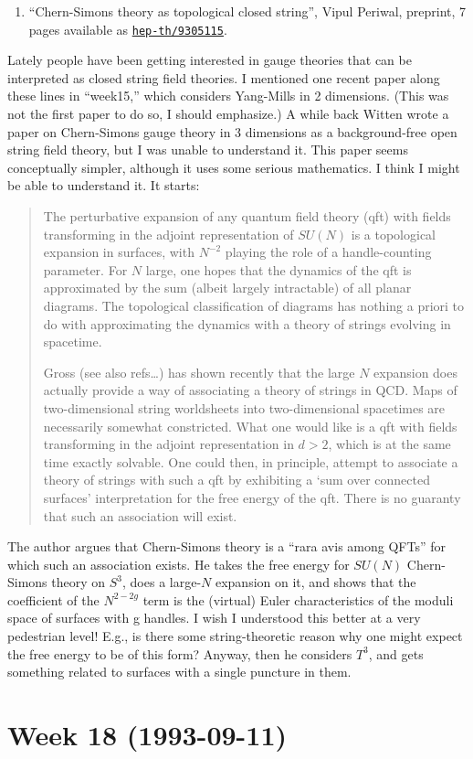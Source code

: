 \documentclass{article}
\def\tightlist{}
\begin{document}
\begin{enumerate}
\def\labelenumi{\arabic{enumi})}
\setcounter{enumi}{10}
\tightlist
\item
  ``Chern-Simons theory as topological closed string'', Vipul Periwal,
  preprint, 7 pages available as
  \href{http://xxx.lanl.gov/abs/hep-th/9305115}{\texttt{hep-th/9305115}}.
\end{enumerate}

Lately people have been getting interested in gauge theories that can be
interpreted as closed string field theories. I mentioned one recent
paper along these lines in ``week15,'' which considers Yang-Mills in 2
dimensions. (This was not the first paper to do so, I should emphasize.)
A while back Witten wrote a paper on Chern-Simons gauge theory in 3
dimensions as a background-free open string field theory, but I was
unable to understand it. This paper seems conceptually simpler, although
it uses some serious mathematics. I think I might be able to understand
it. It starts:

\begin{quote}
The perturbative expansion of any quantum field theory (qft) with fields
transforming in the adjoint representation of \(SU(N)\) is a topological
expansion in surfaces, with \(N^{-2}\) playing the role of a
handle-counting parameter. For \(N\) large, one hopes that the dynamics
of the qft is approximated by the sum (albeit largely intractable) of
all planar diagrams. The topological classification of diagrams has
nothing a priori to do with approximating the dynamics with a theory of
strings evolving in spacetime.

Gross (see also refs\ldots) has shown recently that the large \(N\)
expansion does actually provide a way of associating a theory of strings
in QCD. Maps of two-dimensional string worldsheets into two-dimensional
spacetimes are necessarily somewhat constricted. What one would like is
a qft with fields transforming in the adjoint representation in
\(d > 2\), which is at the same time exactly solvable. One could then,
in principle, attempt to associate a theory of strings with such a qft
by exhibiting a `sum over connected surfaces' interpretation for the
free energy of the qft. There is no guaranty that such an association
will exist.
\end{quote}

The author argues that Chern-Simons theory is a ``rara avis among QFTs''
for which such an association exists. He takes the free energy for
\(SU(N)\) Chern-Simons theory on \(S^3\), does a large-\(N\) expansion
on it, and shows that the coefficient of the \(N^{2-2g}\) term is the
(virtual) Euler characteristics of the moduli space of surfaces with g
handles. I wish I understood this better at a very pedestrian level!
E.g., is there some string-theoretic reason why one might expect the
free energy to be of this form? Anyway, then he considers \(T^3\), and
gets something related to surfaces with a single puncture in them.
\hypertarget{week-18-1993-09-11}{%
\section{Week 18 (1993-09-11)}\label{week-18-1993-09-11}}
\end{document}
